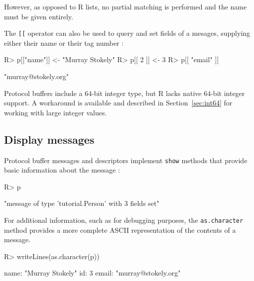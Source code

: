 \documentclass[article]{jss}
\begin{document}
However, as opposed to R lists, no partial matching is performed
and the name must be given entirely.

The \verb|[[| operator can also be used to query and set fields
of a mesages, supplying either their name or their tag number :

\begin{Schunk}
\begin{Sinput}
R> p[["name"]] <- "Murray Stokely"
R> p[[ 2 ]] <- 3
R> p[[ "email" ]]
\end{Sinput}
\begin{Soutput}
[1] "murray@stokely.org"
\end{Soutput}
\end{Schunk}

Protocol buffers include a 64-bit integer type, but R lacks native
64-bit integer support.  A workaround is available and described in
Section~\ref{sec:int64} for working with large integer values.


\subsection{Display messages}

Protocol buffer messages and descriptors implement \texttt{show}
methods that provide basic information about the message :

\begin{Schunk}
\begin{Sinput}
R> p
\end{Sinput}
\begin{Soutput}
[1] "message of type 'tutorial.Person' with 3 fields set"
\end{Soutput}
\end{Schunk}

For additional information, such as for debugging purposes,
the \texttt{as.character} method provides a more complete ASCII
representation of the contents of a message.

\begin{Schunk}
\begin{Sinput}
R> writeLines(as.character(p))
\end{Sinput}
\begin{Soutput}
name: "Murray Stokely"
id: 3
email: "murray@stokely.org"
\end{Soutput}
\end{Schunk}
\end{document}
